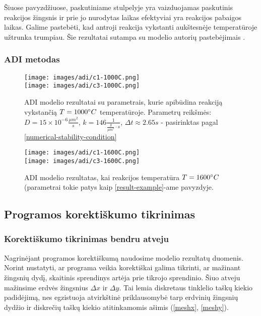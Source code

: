 Šiuose pavyzdžiuose, paskutiniame stulpelyje yra vaizduojamas paskutinis reakcijos žingsnis ir prie jo nurodytas laikas efektyviai yra reakcijos pabaigos laikas. Galime pastebėti, kad antroji reakcija vykstanti aukštesnėje temperatūroje užtrunka trumpiau. Šie rezultatai sutampa su modelio autorių pastebėjimais \cite{mackeviciusCloserLookComputer2012}.

\subsubsection{ADI metodas}

\begin{figure}[h!]
  \centering
  \texttt{[image: images/adi/c1-1000C.png]} \\ 
  \texttt{[image: images/adi/c3-1000C.png]}
  \caption{ADI modelio rezultatai su parametrais, kurie apibūdina reakciją vykstančią $T=1000\degree C$ temperatūroje. Parametrų reikšmės: $D = 15\times 10^{-6} \frac{\mu m^2}{s}$, $k = 146 \frac{1}{ \frac{g}{\mu m^3}\cdot s}$, $\Delta t \approx 2.65s$ - pasirinktas pagal \eqref{numerical-stability-condition} }
  \label{fig:adi-result-T-1200}
\end{figure}

\begin{figure}[h!]
    \centering
    \texttt{[image: images/adi/c1-1600C.png]} \\ 
    \texttt{[image: images/adi/c3-1600C.png]}
    
    \caption{ADI modelio rezultatas, kai reakcijos temperatūra $T=1600\degree C$ (parametrai tokie patys kaip \ref{result-example}-ame pavyzdyje.}
    
    \label{fig:adi-result-T-1600}
  \end{figure}

\subsection{Programos korektiškumo tikrinimas}

\subsubsection*{Korektiškumo tikrinimas bendru atveju}

Nagrinėjant programos korektiškumą naudosime modelio rezultatų duomenis. 
Norint nustatyti, ar programa veikia korektiškai galima tikrinti, ar mažinant žingsnių dydį, skaitinis sprendinys artėja prie tikrojo sprendinio. Šiuo atveju mažinsime erdvės žingsnius $\Delta x$ ir $\Delta y$. Tai lemia diskretaus tinklelio taškų kiekio padidėjimą, nes egzistuoja atvirkštinė priklausomybė tarp erdvinių žingsnių dydžio ir diskrečių taškų kiekio atitinkamomis ašimis (\ref{meshx}, \ref{meshy}).


